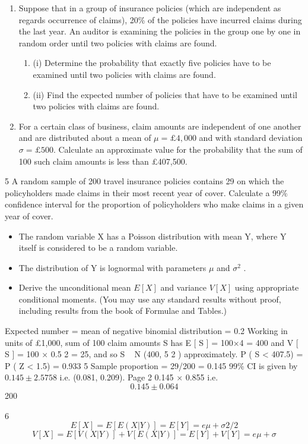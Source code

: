 \documentclass[a4paper,12pt]{article}
\begin{document}
\begin{enumerate}

\item Suppose that in a group of insurance policies (which are independent as regards
occurrence of claims), 20\% of the policies have incurred claims during the last year.
An auditor is examining the policies in the group one by one in random order until
two policies with claims are found.
\begin{enumerate}
\item (i) Determine the probability that exactly five policies have to be examined until
two policies with claims are found.
\item 
(ii) Find the expected number of policies that have to be examined until two
policies with claims are found.
\end{enumerate}

\item For a certain class of business, claim amounts are independent of one another and are
distributed about a mean of $\mu = £4,000$ and with standard deviation $\sigma = £500$.
Calculate an approximate value for the probability that the sum of 100 such claim
amounts is less than £407,500.

\end{enumerate}

\newpage



5
A random sample of 200 travel insurance policies contains 29 on which the
policyholders made claims in their most recent year of cover.
Calculate a 99\% confidence interval for the proportion of policyholders who make
claims in a given year of cover.

\begin{itemize}
    \item The random variable X has a Poisson distribution with mean Y, where Y itself is
considered to be a random variable. 
\item The distribution of Y is lognormal with
parameters $\mu$ and $\sigma^2$ .
\item Derive the unconditional mean $E[X]$ and variance $V[X]$ using appropriate conditional
moments. (You may use any standard results without proof, including results from
the book of Formulae and Tables.)
\end{itemize}




Expected number = mean of negative binomial distribution =
0.2
Working in units of £1,000, sum of 100 claim amounts S has E [ S ] = 100×4 = 400 and
V [ S ] = 100 × 0.5 2 = 25, and so S ~ N (400, 5 2 ) approximately.
P ( S < 407.5) = P ( Z < 1.5) = 0.933
5
Sample proportion = 29/200 = 0.145
99\% CI is given by $0.145 \pm 2.5758$
i.e. (0.081, 0.209).
Page 2
0.145 × 0.855
i.e. \[0.145 \pm 0.064\]
200

6
\[E [ X ] = E [ E ( X | Y )] = E [ Y ] = e \mu+\sigma
2
/2\]
\[V [ X ] = E [ V ( X | Y )] + V [ E ( X | Y )] = E [ Y ] + V [ Y ] = e \mu+\sigma\]
\end{document}
